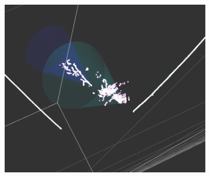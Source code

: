\begin{figure}[htbp]
\begin{center}
\begin{subfigure}{0.45\textwidth}
\includegraphics[width=0.95\linewidth]{figs/datapi0/evd/Run6015Subrun69Evt3465.png}
\caption{}
\end{subfigure}
\begin{subfigure}{0.45\textwidth}

\end{subfigure}
\end{center}
\end{figure}

